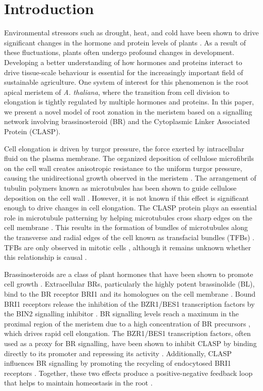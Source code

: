 \documentclass[referee,pdflatex,sn-mathphys-num]{sn-jnl}
\begin{document}
\section{Introduction}\label{sec1}

Environmental stressors such as drought, heat, and cold have been shown to drive significant changes in the hormone and protein levels of plants \cite{halat2020}.
As a result of these fluctuations, plants often undergo profound changes in development.
Developing a better understanding of how hormones and proteins interact to drive tissue-scale behaviour is essential for the increasingly important field of sustainable agriculture.
One system of interest for this phenomenon is the root apical meristem of \emph{A. thaliana}, where the transition from cell division to elongation is tightly regulated by multiple hormones and proteins.
In this paper, we present a novel model of root zonation in the meristem based on a signalling network involving brassinosteroid (BR) and the Cytoplasmic Linker Associated Protein (CLASP).

Cell elongation is driven by turgor pressure, the force exerted by intracellular fluid on the plasma membrane.
The organized deposition of cellulose microfibrils on the cell wall creates anisotropic resistance to the uniform turgor pressure, causing the unidirectional growth observed in the meristem \cite{hamant2010}.
The arrangement of tubulin polymers known as microtubules has been shown to guide cellulose deposition on the cell wall \cite{hamant2010}.
However, it is not known if this effect is significant enough to drive changes in cell elongation.
The CLASP protein plays an essential role in microtubule patterning by helping microtubules cross sharp edges on the cell membrane \cite{ambrose2011}.
This results in the formation of bundles of microtubules along the transverse and radial edges of the cell known as transfacial bundles (TFBs) \cite{halat2022}.
TFBs are only observed in mitotic cells \cite{ambrose2011}, although it remains unknown whether this relationship is causal \cite{halat2022}. 

Brassinosteroids are a class of plant hormones that have been shown to promote cell growth \cite{ackerman-lavert2020}.
Extracellular BRs, particularly the highly potent brassinolide (BL), bind to the BR receptor BRI1 and its homologues on the cell membrane \cite{vukasinovic2021}.
Bound BRI1 receptors release the inhibition of the BZR1/BES1 transcription factors by the BIN2 signalling inhibitor \cite{ackerman-lavert2020}.
BR signalling levels reach a maximum in the proximal region of the meristem due to a high concentration of BR precursors \cite{vukasinovic2021}, which drives rapid cell elongation.
The BZR1/BES1 transcription factors, often used as a proxy for BR signalling, have been shown to inhibit CLASP by binding directly to its promoter and repressing its activity \cite{ruan2018}.
Additionally, CLASP influences BR signalling by promoting the recycling of endocytosed BRI1 receptors \cite{ruan2018}.
Together, these two effects produce a positive-negative feedback loop that helps to maintain homeostasis in the root \cite{ruan2018}.
\end{document}
